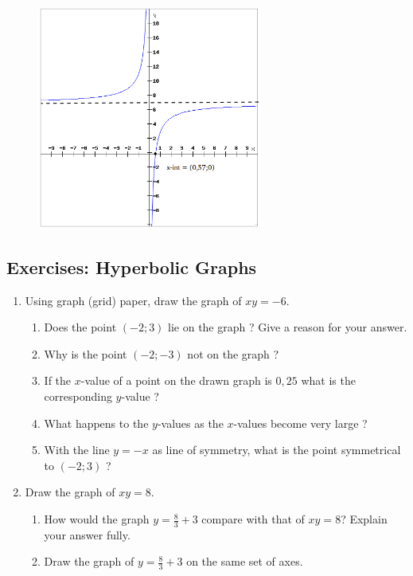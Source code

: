 {\begin{mdframed}[linewidth=4, leftmargin=40, rightmargin=40]
\begin{exercise}
\begin{enumerate}[noitemsep, label=\textbf{Step} \textbf{\arabic*}. ]
\begin{figure}[H]
\begin{center}
\label{m39341*uid12479!!!underscore!!!media}\label{m39341*uid12479!!!underscore!!!printimage}\includegraphics[width=280px]{col11306.imgs/m39341_hyperbola1.png} %
\vspace{2pt}
\vspace{.1in}
\end{center}
\end{figure}       
\end{enumerate}
\end{exercise}
\end{mdframed}
}
\noindent

\subsection*{Exercises: Hyperbolic Graphs }
\nopagebreak
\begin{enumerate}[noitemsep, label=\textbf{\arabic*}. ] 
\item Using graph (grid) paper, draw the graph of $xy=-6$.
\begin{enumerate}[noitemsep, label=\textbf{\alph*}. ] 
\item Does the point $(-2; 3)$ lie on the graph ? Give a reason for your answer.
\item Why is the point $(-2; -3)$ not on the graph ?
\item If the $x$-value of a point on the drawn graph is $0,25$ what is the corresponding $y$-value ?
\item What happens to the $y$-values as the $x$-values become very large ?
\item With the line $y=-x$ as line of symmetry, what is the point symmetrical to $(-2; 3)$ ?
\end{enumerate}
  \item Draw the graph of $xy=8$.
\begin{enumerate}[noitemsep, label=\textbf{\alph*}. ] 
\item How would the graph $y=\frac{8}{3}+3$ compare with that of $xy=8$? Explain your answer fully.
\item Draw the graph of $y=\frac{8}{3}+3$ on the same set of axes.
\end{enumerate}
  \end{enumerate}

